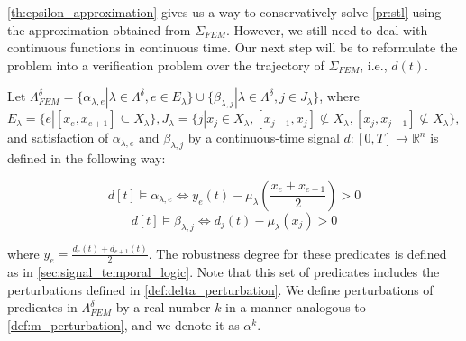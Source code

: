 \documentclass[letterpaper, 10 pt, conference]{ieeeconf/ieeeconf}
\newcommand*{\R}{\mathbb{R}}
\begin{document}
\cref{th:epsilon_approximation} gives us a way to conservatively solve
\cref{pr:stl} using the approximation obtained from $\Sigma_{FEM}$.
However, we still need to deal with continuous functions in continuous time. Our
next step will be to reformulate the problem into a verification problem over
the trajectory of $\Sigma_{FEM}$, i.e., $d(t)$.

Let $\Lambda^{\delta}_{FEM} = \{\alpha_{\lambda, e} | \lambda \in
\Lambda^{\delta}, e \in E_{\lambda}\} \cup \{\beta_{\lambda, j} | \lambda \in
\Lambda^{\delta}, j \in J_{\lambda}\}$, where $E_{\lambda} = \{e | [x_e, x_{e+1}] \subseteq
X_{\lambda}\}, J_{\lambda} = \{j | x_j \in X_\lambda, [x_{j-1}, x_j] \not\subseteq
X_\lambda, [x_{j}, x_{j+1}] \not\subseteq X_\lambda \}$,
and satisfaction of $\alpha_{\lambda, e}$ and $\beta_{\lambda, j}$ by 
a continuous-time signal $d : [0, T] \to \R^n$
is defined in the following way:

\begin{equation}
    d[t] \models \alpha_{\lambda, e} \iff y_e(t) - 
    \mu_\lambda(\frac{x_e + x_{e + 1}}{2}) > 0 
\end{equation}
\begin{equation}
     d[t] \models \beta_{\lambda, j} \iff d_j(t) - \mu_\lambda(x_j) > 0
\end{equation}

where $y_e = \frac{d_e(t) + d_{e+1}(t)}{2}$. The robustness degree for these
predicates is defined as in \cref{sec:signal_temporal_logic}.
Note that this set of predicates includes the perturbations defined in
\cref{def:delta_perturbation}. We define perturbations of predicates in
$\Lambda^{\delta}_{FEM}$ by a real number $k$ in a manner analogous to
\cref{def:m_perturbation}, and we denote it as $\alpha^k$.
\end{document}
